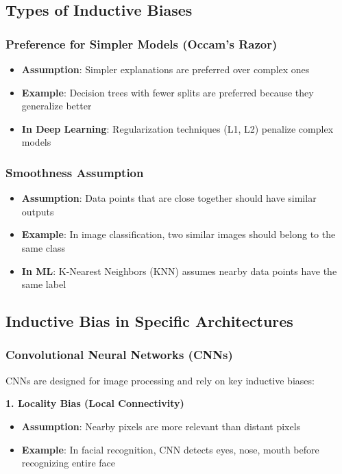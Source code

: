 \subsection{Types of Inductive Biases}

\subsubsection{Preference for Simpler Models (Occam's Razor)}
\begin{itemize}
    \item \textbf{Assumption}: Simpler explanations are preferred over complex ones
    \item \textbf{Example}: Decision trees with fewer splits are preferred because they generalize better
    \item \textbf{In Deep Learning}: Regularization techniques (L1, L2) penalize complex models
\end{itemize}

\subsubsection{Smoothness Assumption}
\begin{itemize}
    \item \textbf{Assumption}: Data points that are close together should have similar outputs
    \item \textbf{Example}: In image classification, two similar images should belong to the same class
    \item \textbf{In ML}: K-Nearest Neighbors (KNN) assumes nearby data points have the same label
\end{itemize}

\subsection{Inductive Bias in Specific Architectures}
\subsubsection{Convolutional Neural Networks (CNNs)}
CNNs are designed for image processing and rely on key inductive biases:

\textbf{1. Locality Bias (Local Connectivity)}
\begin{itemize}
    \item \textbf{Assumption}: Nearby pixels are more relevant than distant pixels
    \item \textbf{Example}: In facial recognition, CNN detects eyes, nose, mouth before recognizing entire face
\end{itemize}

